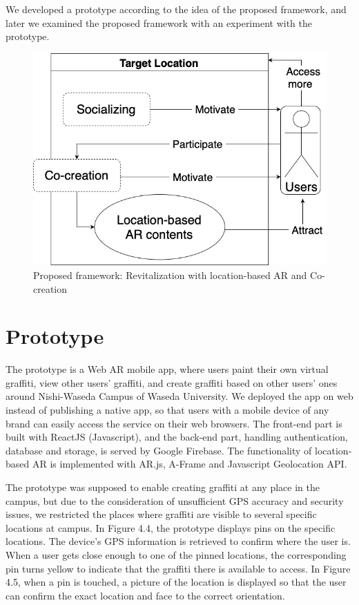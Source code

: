 We developed a prototype according to the idea of the proposed framework, and later we examined the proposed framework with an experiment with the prototype.

\begin{figure}
  \centering
  \includegraphics[width=0.85\columnwidth]{resources/4_methodology/proposed_framework_revitalization_with_AR_and_cocreation.png}
    \caption{Proposed framework: Revitalization with location-based AR and Co-creation}
\end{figure}

\section{Prototype}
The prototype is a Web AR mobile app, where users paint their own virtual graffiti, view other users' graffiti, and create graffiti based on other users' ones around Nishi-Waseda Campus of Waseda University.
We deployed the app on web instead of publishing a native app, so that users with a mobile device of any brand can easily access the service on their web browsers.
The front-end part is built with ReactJS (Javascript), and the back-end part, handling authentication, database and storage, is served by Google Firebase.
The functionality of location-based AR is implemented with AR.js, A-Frame and Javascript Geolocation API.

The prototype was supposed to enable creating graffiti at any place in the campus, but due to the consideration of unsufficient GPS accuracy and security issues,
we restricted the places where graffiti are visible to several specific locations at campus.
In Figure 4.4, the prototype displays pins on the specific locations. The device's GPS information is retrieved to confirm where the user is.
When a user gets close enough to one of the pinned locations, the corresponding pin turns yellow to indicate that the graffiti there is available to access.
In Figure 4.5, when a pin is touched, a picture of the location is displayed so that the user can confirm the exact location and face to the correct orientation.


